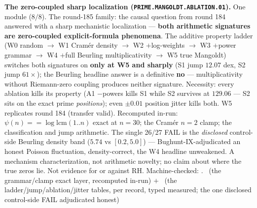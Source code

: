 \par\smallskip\noindent\textbf{The zero-coupled sharp localization
(\texttt{PRIME.\allowbreak MANGOLDT.\allowbreak ABLATION.01}).}
One module ($8/8$).  The round-185 family: the causal question
from round 184 answered with a sharp mechanistic localization ---
\textbf{both arithmetic signatures are zero-coupled
explicit-formula phenomena}.  The additive property ladder (W0
random $\to$ W1 Cram\'er density $\to$ W2 $+$log-weights $\to$ W3
$+$power grammar $\to$ W4 $+$full Beurling multiplicativity $\to$
W5 true Mangoldt) switches both signatures on \textbf{only at W5
and sharply} (S1 jump $12.07$ dex, S2 jump $61\times$); the
Beurling headline answer is a definitive \textbf{no} ---
multiplicativity without Riemann-zero coupling produces neither
signature.  Necessity: every ablation kills its property (A1
$-$powers kills S1 while S2 survives at $129.06$ --- S2 sits on
the exact prime \emph{positions}); even $\pm 0.01$ position
jitter kills both.  W5 replicates round 184 (transfer valid).
Recomputed in-run: $\psi(n) == \log\mathrm{lcm}(1..n)$ exact at
$n = 30$; the Cram\'er $n = 2$ clamp; the classification and jump
arithmetic.  The single 26/27 FAIL is the \emph{disclosed}
control-side Beurling density band ($5.74$ vs $[0.2, 5.0]$) ---
Bughunt-IX-adjudicated an honest Poisson fluctuation,
density-correct, the W4 headline unweakened.  A mechanism
characterization, not arithmetic novelty; no claim about where
the true zeros lie.  Not evidence for or against RH.
Machine-checked: .
\mE\ (the grammar/clamp exact layer, recomputed in-run) $+$ \mC\
(the ladder/jump/ablation/jitter tables, per record, typed
measured; the one disclosed control-side FAIL adjudicated honest)
\par\smallskip


